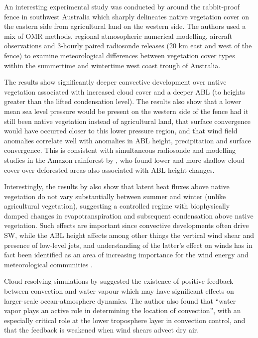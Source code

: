 An interesting experimental study was conducted by \citet{nair2011} around the rabbit-proof fence in southwest Australia which sharply delineates native vegetation cover on the eastern side from agricultural land on the western side. The authors used a mix of \ac{OMR} methods, regional atmosopheric numerical modelling, aircraft observations and 3-hourly paired radiosonde releases (20 km east and west of the fence) to examine meteorological differences between vegetation cover types within the summertime and wintertime west coast trough of Australia.

The results show significantly deeper convective development over native vegetation associated with increased cloud cover and a deeper \ac{ABL} (to heights greater than the lifted condensation level). The results also show that a lower mean sea level pressure would be present on the western side of the fence had it still been native vegetation instead of agricultural land, that surface convergence would have occurred closer to this lower pressure region, and that wind field anomalies correlate well with anomalies in \ac{ABL} height, precipitation and surface convergence. This is consistent with simultaneous radiosonde and modelling studies in the Amazon rainforest by \citet{wang2009, xu2022}, who found lower and more shallow cloud cover over deforested areas also associated with \ac{ABL} height changes. 

Interestingly, the results by \citet{nair2011} also show that latent heat fluxes above native vegetation do not vary substantially between summer and winter (unlike agricultural vegetation), suggesting a controlled regime with biophysically damped changes in evapotranspiration and subsequent condensation above native vegetation. Such effects are important since convective developments often drive \ac{SW}, while the \ac{ABL} height affects among other things the vertical wind shear and presence of low-level jets, and understanding of the latter’s effect on winds has in fact been identified as an area of increasing importance for the wind energy and meteorological communities \citep{pena2013}.

Cloud-resolving simulations by \citet{tompkins2001_org, tompkins2001_rel} suggested the existence of positive feedback between convection and water vapour which may have significant effects on larger-scale ocean-atmosphere dynamics. The author also found that “water vapor plays an active role in determining the location of convection”, with an especially critical role at the lower troposphere layer in convection control, and that the feedback is weakened when wind shears advect dry air.

